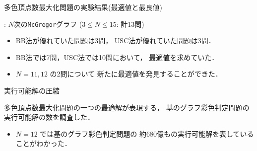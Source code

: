 \documentclass[dvipdfmx,11pt]{beamer}
\newcommand{\code}[1]{\lstinline[basicstyle=\ttfamily]{#1}}
\begin{document}
\begin{frame}{多色頂点数最大化問題の実験結果(最適値と最良値)}
 \begin{block}{}
  : $N$次の\code{McGregor}グラフ ($3 \leq N\leq 15$: 計13問)
 \end{block}
 
 \begin{center}
 \end{center}

 \begin{itemize}
  \item BB法が優れていた問題は3問，
        USC法が優れていた問題は3問．
  \item BB法では7問，USC法では10問において，
	最適値を求めていた．
  \item $N = 11,12$ の2問について
	新たに最適値を発見することができた．
 \end{itemize}
\end{frame}

\begin{frame}{実行可能解の圧縮}
 \begin{block}{}
  多色頂点数最大化問題の一つの最適解が表現する，
  基のグラフ彩色判定問題の実行可能解の数を調査した．
 \end{block}
 
 \begin{center}
 \end{center}

 \begin{itemize}
  \item $N = 12$ では基のグラフ彩色判定問題の
	約680億もの実行可能解を表していることがわかった．
 \end{itemize}
\end{frame}
\end{document}

